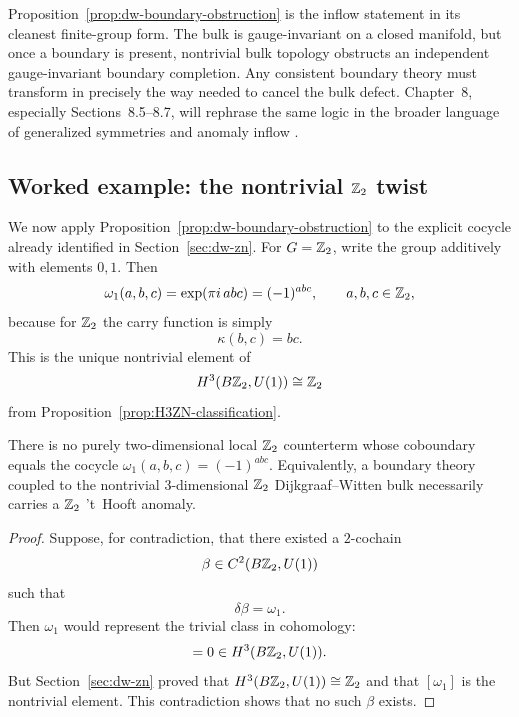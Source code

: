 \noindent Proposition~\ref{prop:dw-boundary-obstruction} is the inflow statement in its cleanest finite-group form. The bulk is gauge-invariant on a closed manifold, but once a boundary is present, nontrivial bulk topology obstructs an independent gauge-invariant boundary completion. Any consistent boundary theory must transform in precisely the way needed to cancel the bulk defect. Chapter~8, especially Sections~8.5--8.7, will rephrase the same logic in the broader language of generalized symmetries and anomaly inflow \cite{FreedMooreTeleman2024,Bhardwaj2023Lectures}.

\subsection{Worked example: the nontrivial \texorpdfstring{$\mathbb{Z}_2$}{Z\_2} twist}

We now apply Proposition~\ref{prop:dw-boundary-obstruction} to the explicit cocycle already identified in Section~\ref{sec:dw-zn}. For $G=\mathbb{Z}_2$, write the group additively with elements $0,1$. Then
\begin{equation}\label{eq:omega-z2}
\omega_1(a,b,c)
=
\exp\!\left(\pi i\,abc\right)
=
(-1)^{abc},
\qquad
a,b,c\in \mathbb{Z}_2,
\end{equation}
because for $\mathbb{Z}_2$ the carry function is simply
\begin{equation*}
\kappa(b,c)=bc.
\end{equation*}
This is the unique nontrivial element of
\begin{equation*}
H^3(B\mathbb{Z}_2,U(1))\cong \mathbb{Z}_2
\end{equation*}
from Proposition~\ref{prop:H3ZN-classification}.

\begin{proposition}\label{prop:z2-twist-anomaly}
There is no purely two-dimensional local $\mathbb{Z}_2$ counterterm whose coboundary equals the cocycle $\omega_1(a,b,c)=(-1)^{abc}$. Equivalently, a boundary theory coupled to the nontrivial $3$-dimensional $\mathbb{Z}_2$ Dijkgraaf--Witten bulk necessarily carries a $\mathbb{Z}_2$ 't~Hooft anomaly.
\end{proposition}

\begin{proof}
Suppose, for contradiction, that there existed a $2$-cochain
\begin{equation*}
\beta\in C^2(B\mathbb{Z}_2,U(1))
\end{equation*}
such that
\begin{equation*}
\delta\beta=\omega_1.
\end{equation*}
Then $\omega_1$ would represent the trivial class in cohomology:
\begin{equation*}
[\omega_1]=0\in H^3(B\Z_2,U(1)).
\end{equation*}
But Section~\ref{sec:dw-zn} proved that $H^3(B\mathbb{Z}_2,U(1))\cong \mathbb{Z}_2$ and that $[\omega_1]$ is the nontrivial element. This contradiction shows that no such $\beta$ exists.
\end{proof}

